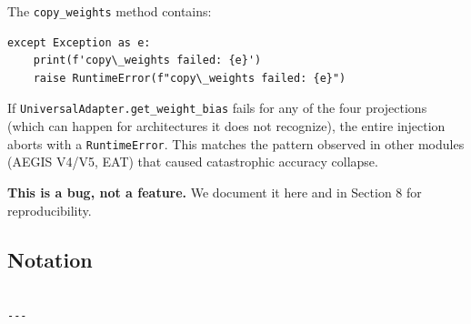 The \texttt{copy\_weights} method contains:

\begin{lstlisting}
except Exception as e:
    print(f'copy\_weights failed: {e}')
    raise RuntimeError(f"copy\_weights failed: {e}")
\end{lstlisting}

If \texttt{UniversalAdapter.get\_weight\_bias} fails for any of the four 
projections (which can happen for architectures it does not recognize), 
the entire injection aborts with a \texttt{RuntimeError}. This matches the 
pattern observed in other modules (AEGIS V4/V5, EAT) that caused 
catastrophic accuracy collapse.

\textbf{This is a bug, not a feature.} We document it here and in Section 8 
for reproducibility.



\subsection{Notation}

\begin{lstlisting}

---
\end{lstlisting}